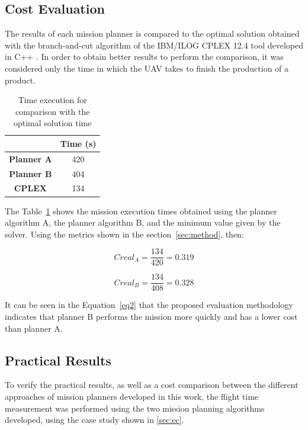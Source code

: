 \documentclass[conference,harvard,brazil,english]{sbatex}
\begin{document}
\subsection{Cost Evaluation}
\label{ssec:acusto}

The results of each mission planner is compared to the optimal solution obtained with the branch-and-cut algorithm of the IBM/ILOG CPLEX 12.4 tool developed in C++ \cite{cplex2003ilog}. In order to obtain better results to perform the comparison, it was considered only the time in which the UAV takes to finish the production of a product.

\begin{table}[H]
\centering
\begin{tabular}{@{}
>{\columncolor[HTML]{FFFFFF}}c 
>{\columncolor[HTML]{FFFFFF}}c @{}}
\cmidrule(l){2-2}
                      & \textbf{Time (s)}    \\ \midrule
\textbf{Planner A} & 420					  \\
\textbf{Planner B} & 404                   \\
\textbf{CPLEX}        & 134                   \\ \bottomrule
\end{tabular}
\caption{Time execution for comparison with the optimal solution time}
\label{fig:comp}
\end{table}

The Table~\ref{fig:comp} shows the mission execution times obtained using the planner algorithm A, the planner algorithm B, and the minimum value given by the solver. Using the metrics shown in the section~\ref{sec:method}, then:

\begin{equation}
Creal_A=\frac{134}{420}=0.319
\label{eq1}
\end{equation}

\begin{equation}
Creal_B=\frac{134}{408}=0.328
\label{eq2}
\end{equation}

It can be seen in the Equation~\ref{eq2} that the proposed evaluation methodology indicates that planner B performs the mission more quickly and has a lower cost than planner A.

\subsection{Practical Results}

To verify the practical results, as well as a cost comparison between the different approaches of mission planners developed in this work, the flight time measurement was performed using the two mission planning algorithms developed, using the case study shown in \ref{sec:ec}.
%
\end{document}
